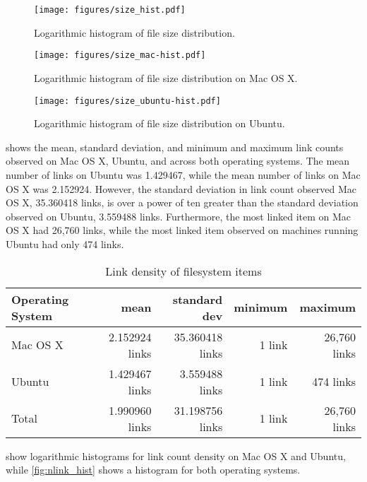 \documentclass[12pt,letterpaper]{article}
\begin{document}
		\begin{figure}[H]
			\centerline{\texttt{[image: figures/size\_hist.pdf]}}
			\caption{Logarithmic histogram of file size distribution.}
			\label{fig:size_hist}
		\end{figure}

		\begin{figure}[H]
			\centerline{\texttt{[image: figures/size\_mac-hist.pdf]}}
			\caption{Logarithmic histogram of file size distribution on Mac OS X.}
			\label{fig:size_mac-hist}
		\end{figure}

		\begin{figure}[H]
			\centerline{\texttt{[image: figures/size\_ubuntu-hist.pdf]}}
			\caption{Logarithmic histogram of file size distribution on Ubuntu.}
			\label{fig:size_ubuntu-hist}
		\end{figure}

		 shows the mean, standard deviation, and minimum and maximum link counts observed on Mac OS X, Ubuntu, and across both operating systems. The mean number of links on Ubuntu was 1.429467, while the mean number of links on Mac OS X was 2.152924. However, the standard deviation in link count observed Mac OS X, 35.360418 links, is over a power of ten greater than the standard deviation observed on Ubuntu, 3.559488 links. Furthermore, the most linked item on Mac OS X had 26,760 links, while the most linked item observed on machines running Ubuntu had only 474 links.

		\begin{table}[h]
		\caption{Link density of filesystem items}
		\label{table:nlink}
			\begin{tabular}{l r r r r}
			Operating System & mean  & standard dev & minimum & maximum \\
			\hline
			Mac OS X & 2.152924 links & 35.360418 links & 1 link & 26,760 links \\
			Ubuntu &  1.429467 links & 3.559488 links & 1 link & 474 links \\
			Total & 1.990960 links & 31.198756 links & 1 link & 26,760 links \\
			\end{tabular}
		\end{table}

		 show logarithmic histograms for link count density on Mac OS X and Ubuntu, while \cref{fig:nlink_hist} shows a histogram for both operating systems.
\end{document}
